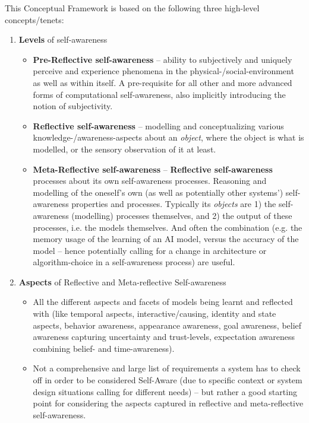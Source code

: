 \documentclass{article}
\begin{document}
This Conceptual Framework is based on the following three high-level concepts/tenets:
\begin{enumerate}
    \item \textbf{Levels} of self-awareness
    \begin{itemize}
        \item \textbf{Pre-Reflective self-awareness} -- ability to subjectively and uniquely perceive and experience phenomena in the physical-/social-environment as well as within itself. A pre-requisite for all other and more advanced forms of computational self-awareness, also implicitly introducing the notion of subjectivity.
        \item \textbf{Reflective self-awareness} -- modelling and conceptualizing various knowledge-/awareness-aspects about an \textit{object}, where the object is what is modelled, or the sensory observation of it at least.
        \item \textbf{Meta-Reflective self-awareness} -- \textbf{Reflective self-awareness} processes about its own self-awareness processes. Reasoning and modelling of the oneself's own (as well as potentially other systems') self-awareness properties and processes. Typically its \textit{objects} are 1) the self-awareness (modelling) processes themselves, and 2) the output of these processes, i.e. the models themselves. And often the combination (e.g. the memory usage of the learning of an AI model, versus the accuracy of the model -- hence potentially calling for a change in architecture or algorithm-choice in a self-awareness process) are useful.
    \end{itemize}
    
    \item \textbf{Aspects} of Reflective and Meta-reflective Self-awareness
        \begin{itemize}
            \item All the different aspects and facets of models being learnt and reflected with (like temporal aspects, interactive/causing, identity and state aspects, behavior awareness, appearance awareness, goal awareness, belief awareness capturing uncertainty and trust-levels, expectation awareness combining belief- and time-awareness).
            \item Not a comprehensive and large list of requirements a system has to check off in order to be considered Self-Aware (due to specific context or system design situations calling for different needs) -- but rather a good starting point for considering the aspects captured in reflective and meta-reflective self-awareness.
        \end{itemize}
        

\end{enumerate}
\end{document}

